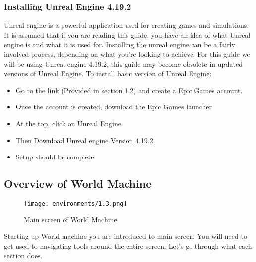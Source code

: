 \documentclass[../main.tex]{subfiles}
\begin{document}
\subsubsection{Installing Unreal Engine 4.19.2}
Unreal engine is a powerful application used for creating games and simulations. It is assumed that if you are reading this guide, you have an idea of what Unreal engine is and what it is used for. Installing the unreal engine can be a fairly involved process, depending on what you're looking to achieve.
For this guide we will be using Unreal engine 4.19.2, this guide may become obsolete in updated versions of Unreal Engine.
To install basic version of Unreal Engine:
\begin{itemize}
    \item Go to the link (Provided in section 1.2) and create a Epic Games account.
    \item Once the account is created, download the Epic Games launcher
    \item At the top, click on Unreal Engine
    \item Then Download Unreal engine Version 4.19.2.
    \item Setup should be complete.
\end{itemize}

\subsection{Overview of World Machine}
\begin{figure}[H]
\texttt{[image: environments/1.3.png]}
\caption{Main screen of World Machine}
\end{figure}
Starting up World machine you are introduced to main screen. You will need to get used to navigating tools around the entire screen. Let’s go through what each section does. 
\end{document}
